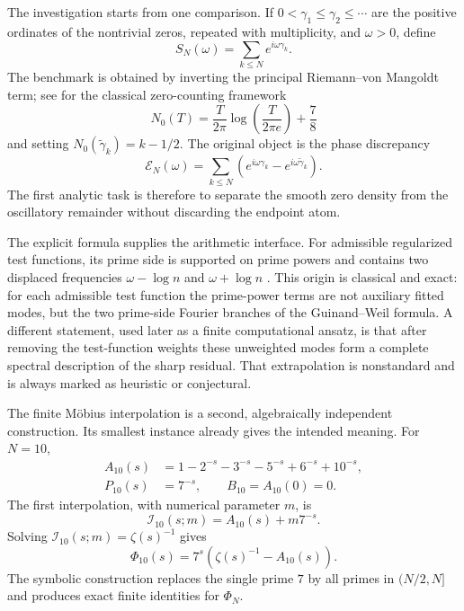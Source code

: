 \documentclass[11pt]{amsart}
\numberwithin{equation}{section}
\theoremstyle{plain}
\theoremstyle{definition}
\theoremstyle{remark}
\newcommand{\1}{\mathbf{1}}
\begin{document}
The investigation starts from one comparison.  If
$0<\gamma_1\leq\gamma_2\leq\cdots$ are the positive ordinates of the
nontrivial zeros, repeated with multiplicity, and $\omega>0$, define
\begin{equation}
S_N(\omega)=\sum_{k\leq N}e^{i\omega\gamma_k}.
\label{eq:intro_SN_omega}
\end{equation}
The benchmark is obtained by inverting the principal
Riemann--von Mangoldt term; see \cite{Edwards1974,Titchmarsh1986} for the
classical zero-counting framework
\begin{equation}
N_0(T)=\frac{T}{2\pi}\log\!\left(\frac{T}{2\pi e}\right)+\frac78
\label{eq:intro_N0}
\end{equation}
and setting $N_0(\widetilde\gamma_k)=k-1/2$.  The original object is the
phase discrepancy
\begin{equation}
\mathcal E_N(\omega)
=
\sum_{k\leq N}
\left(e^{i\omega\gamma_k}-e^{i\omega\widetilde\gamma_k}\right).
\label{eq:intro_discrepancy}
\end{equation}
The first analytic task is therefore to separate the smooth zero density from
the oscillatory remainder without discarding the endpoint atom.

The explicit formula supplies the arithmetic interface.  For admissible
regularized test functions, its prime side is supported on prime powers and
contains two displaced frequencies $\omega-\log n$ and
$\omega+\log n$ \cite{Guinand1947,Guinand1949,Guinand1948,Weil1952}.
This origin is classical and exact: for each admissible test function the
prime-power terms are not auxiliary fitted modes, but the two prime-side
Fourier branches of the Guinand--Weil formula.  A different statement, used
later as a finite computational ansatz, is that after removing the test-function
weights these unweighted modes form a complete spectral description of the
sharp residual.  That extrapolation is nonstandard and is always marked as
heuristic or conjectural.

The finite Möbius interpolation is a second, algebraically independent
construction.  Its smallest instance already gives the intended meaning.
For $N=10$,
\begin{align}
A_{10}(s)
&=1-2^{-s}-3^{-s}-5^{-s}+6^{-s}+10^{-s},
\label{eq:intro_A10}
\\
P_{10}(s)&=7^{-s},
\qquad B_{10}=A_{10}(0)=0.
\label{eq:intro_P10_B10}
\end{align}
The first interpolation, with numerical parameter $m$, is
\begin{equation}
\mathcal I_{10}(s;m)=A_{10}(s)+m7^{-s}.
\label{eq:intro_I10}
\end{equation}
Solving $\mathcal I_{10}(s;m)=\zeta(s)^{-1}$ gives
\begin{equation}
\Phi_{10}(s)=7^s\left(\zeta(s)^{-1}-A_{10}(s)\right).
\label{eq:intro_Phi10}
\end{equation}
The symbolic construction replaces the single prime $7$ by all primes in
$(N/2,N]$ and produces exact finite identities for $\Phi_N$.
\end{document}
